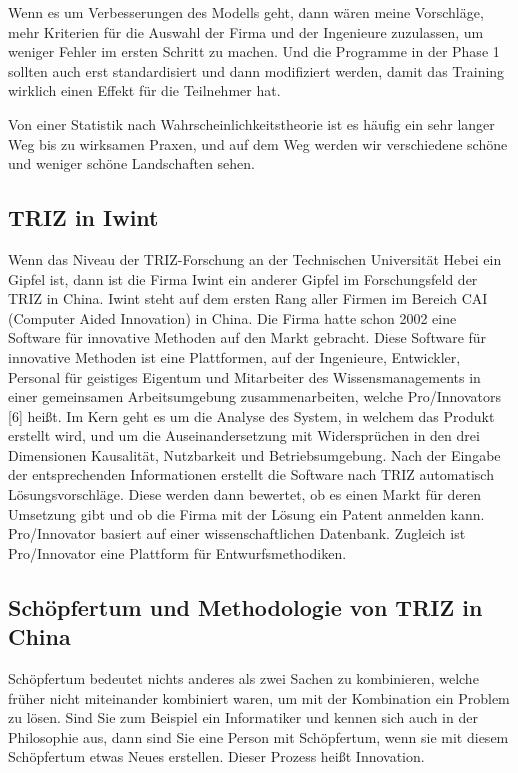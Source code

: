 \documentclass[11pt,a4paper]{article}
\begin{document}
Wenn es um Verbesserungen des Modells geht, dann wären meine Vorschläge, mehr
Kriterien für die Auswahl der Firma und der Ingenieure zuzulassen, um weniger
Fehler im ersten Schritt zu machen. Und die Programme in der Phase 1 sollten
auch erst standardisiert und dann modifiziert werden, damit das Training
wirklich einen Effekt für die Teilnehmer hat.

Von einer Statistik nach Wahrscheinlichkeitstheorie ist es häufig ein sehr
langer Weg bis zu wirksamen Praxen, und auf dem Weg werden wir verschiedene
schöne und weniger schöne Landschaften sehen.

\subsection{TRIZ in Iwint}
Wenn das Niveau der TRIZ-Forschung an der Technischen Universität Hebei ein
Gipfel ist, dann ist die Firma Iwint ein anderer Gipfel im Forschungsfeld der
TRIZ in China. Iwint steht auf dem ersten Rang aller Firmen im Bereich CAI
(Computer Aided Innovation) in China.  Die Firma hatte schon 2002 eine
Software für innovative Methoden auf den Markt gebracht. Diese Software für
innovative Methoden ist eine Plattformen, auf der Ingenieure, Entwickler,
Personal für geistiges Eigentum und Mitarbeiter des Wissensmanagements in
einer gemeinsamen Arbeitsumgebung zusammenarbeiten, welche Pro/Innovators [6]
heißt.  Im Kern geht es um die Analyse des System, in welchem das Produkt
erstellt wird, und um die Auseinandersetzung mit Widersprüchen in den drei
Dimensionen Kausalität, Nutzbarkeit und Betriebsumgebung.  Nach der Eingabe
der entsprechenden Informationen erstellt die Software nach TRIZ automatisch
Lösungsvorschläge. Diese werden dann bewertet, ob es einen Markt für deren
Umsetzung gibt und ob die Firma mit der Lösung ein Patent anmelden kann.
Pro/Innovator basiert auf einer wissenschaftlichen Datenbank. Zugleich ist
Pro/Innovator eine Plattform für Entwurfsmethodiken.

\subsection{Schöpfertum und Methodologie von TRIZ in China}
Schöpfertum bedeutet nichts anderes als zwei Sachen zu kombinieren, welche
früher nicht miteinander kombiniert waren, um mit der Kombination ein Problem
zu lösen. Sind Sie zum Beispiel ein Informatiker und kennen sich auch in der
Philosophie aus, dann sind Sie eine Person mit Schöpfertum, wenn sie mit
diesem Schöpfertum etwas Neues erstellen. Dieser Prozess heißt Innovation.
\end{document}
